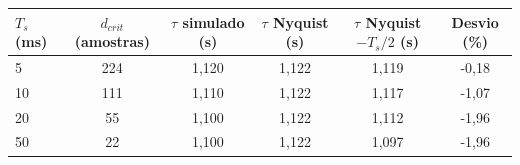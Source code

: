 \begin{tabular}{lccccc}
\hline
$T_s$ (ms) & $d_{crit}$ (amostras) & $\tau$ simulado (s) & $\tau$ Nyquist (s) & $\tau$ Nyquist $- T_s/2$ (s) & Desvio (\%) \\
\hline
5 & 224 & 1{,}120 & 1{,}122 & 1{,}119 & -0{,}18 \\
10 & 111 & 1{,}110 & 1{,}122 & 1{,}117 & -1{,}07 \\
20 & 55 & 1{,}100 & 1{,}122 & 1{,}112 & -1{,}96 \\
50 & 22 & 1{,}100 & 1{,}122 & 1{,}097 & -1{,}96 \\
\hline
\end{tabular}
